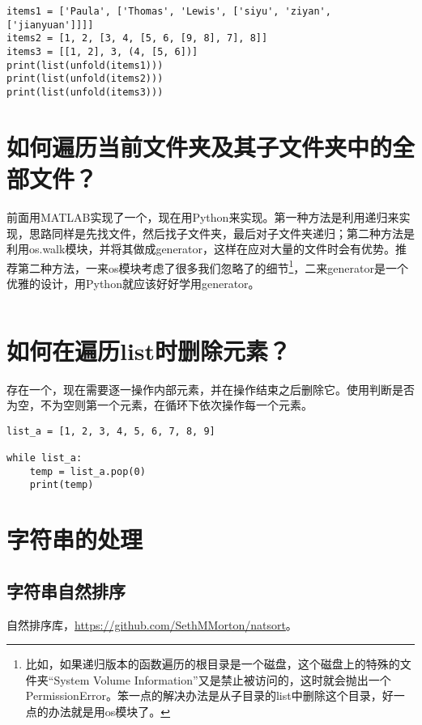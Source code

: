 \begin{verbatim}
items1 = ['Paula', ['Thomas', 'Lewis', ['siyu', 'ziyan', ['jianyuan']]]]
items2 = [1, 2, [3, 4, [5, 6, [9, 8], 7], 8]]
items3 = [[1, 2], 3, (4, [5, 6])]
print(list(unfold(items1)))
print(list(unfold(items2)))
print(list(unfold(items3)))
\end{verbatim}

\section{如何遍历当前文件夹及其子文件夹中的全部文件？}

前面用MATLAB实现了一个，现在用Python来实现。第一种方法是利用递归来实现，思路同样是先找文件，然后找子文件夹，最后对子文件夹递归；第二种方法是利用os.walk模块，并将其做成generator，这样在应对大量的文件时会有优势。推荐第二种方法，一来os模块考虑了很多我们忽略了的细节\footnote{比如，如果递归版本的函数遍历的根目录是一个磁盘，这个磁盘上的特殊的文件夹“System Volume Information”又是禁止被访问的，这时就会抛出一个PermissionError。笨一点的解决办法是从子目录的list中删除这个目录，好一点的办法就是用os模块了。}，二来generator是一个优雅的设计，用Python就应该好好学用generator。

\inputminted{python}{code/python/get_all_file_name.py}

\section{如何在遍历list时删除元素？}

存在一个，现在需要逐一操作内部元素，并在操作结束之后删除它。使用判断是否为空，不为空则第一个元素，在循环下依次操作每一个元素。

\begin{verbatim}
list_a = [1, 2, 3, 4, 5, 6, 7, 8, 9]

while list_a:
    temp = list_a.pop(0)
    print(temp)
\end{verbatim}

\section{字符串的处理}

\subsection{字符串自然排序}

自然排序库，\url{https://github.com/SethMMorton/natsort}。

